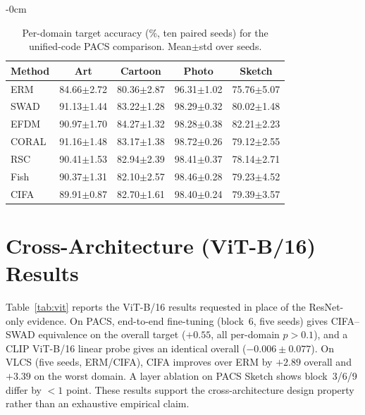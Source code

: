 \documentclass[electronics,article,submit,moreauthors]{Definitions/mdpi}
\begin{document}
\begin{adjustwidth}{-\extralength}{0cm}
\begin{table}[H]
\centering
\caption{Per-domain target accuracy (\%, ten paired seeds) for the unified-code PACS comparison. Mean$\pm$std over seeds.}
\label{tab:classicperdom}
\setlength{\tabcolsep}{4.5pt}
\footnotesize
\begin{tabular}{lcccc}
\toprule
\textbf{Method} & \textbf{Art} & \textbf{Cartoon} & \textbf{Photo} & \textbf{Sketch}\\
\midrule
ERM   & 84.66$\pm$2.72 & 80.36$\pm$2.87 & 96.31$\pm$1.02 & 75.76$\pm$5.07 \\
SWAD  & 91.13$\pm$1.44 & 83.22$\pm$1.28 & 98.29$\pm$0.32 & 80.02$\pm$1.48 \\
EFDM  & 90.97$\pm$1.70 & 84.27$\pm$1.32 & 98.28$\pm$0.38 & 82.21$\pm$2.23 \\
CORAL & 91.16$\pm$1.48 & 83.17$\pm$1.38 & 98.72$\pm$0.26 & 79.12$\pm$2.55 \\
RSC   & 90.41$\pm$1.53 & 82.94$\pm$2.39 & 98.41$\pm$0.37 & 78.14$\pm$2.71 \\
Fish  & 90.37$\pm$1.31 & 82.10$\pm$2.57 & 98.46$\pm$0.28 & 79.23$\pm$4.52 \\
CIFA  & 89.91$\pm$0.87 & 82.70$\pm$1.61 & 98.40$\pm$0.24 & 79.39$\pm$3.57 \\
\bottomrule
\end{tabular}
\end{table}
\section{Cross-Architecture (ViT-B/16) Results}
\label{sec:appvit}

Table~\ref{tab:vit} reports the ViT-B/16 results requested in place of the ResNet-only evidence. On PACS, end-to-end fine-tuning (block~6, five seeds) gives CIFA--SWAD equivalence on the overall target ($+0.55$, all per-domain $p>0.1$), and a CLIP ViT-B/16 linear probe gives an identical overall ($-0.006\pm0.077$). On VLCS (five seeds, ERM/CIFA), CIFA improves over ERM by $+2.89$ overall and $+3.39$ on the worst domain. A layer ablation on PACS Sketch shows block~3/6/9 differ by $<1$ point. These results support the cross-architecture design property rather than an exhaustive empirical claim.


\end{adjustwidth}
\end{document}
